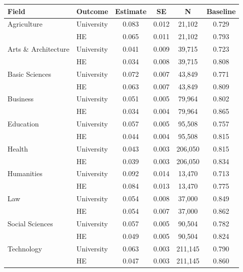 \begin{tabular}{llcccc}
\toprule
Field & Outcome & Estimate & SE & N & Baseline \\
\midrule
Agriculture & University & 0.083 & 0.012 &    21,102 & 0.729 \\
 & HE & 0.065 & 0.011 &    21,102 & 0.793 \\
\midrule
Arts \& Architecture & University & 0.041 & 0.009 &    39,715 & 0.723 \\
 & HE & 0.034 & 0.008 &    39,715 & 0.808 \\
\midrule
Basic Sciences & University & 0.072 & 0.007 &    43,849 & 0.771 \\
 & HE & 0.063 & 0.007 &    43,849 & 0.809 \\
\midrule
Business & University & 0.051 & 0.005 &    79,964 & 0.802 \\
 & HE & 0.034 & 0.004 &    79,964 & 0.865 \\
\midrule
Education & University & 0.057 & 0.005 &    95,508 & 0.757 \\
 & HE & 0.044 & 0.004 &    95,508 & 0.815 \\
\midrule
Health & University & 0.043 & 0.003 &   206,050 & 0.815 \\
 & HE & 0.039 & 0.003 &   206,050 & 0.834 \\
\midrule
Humanities & University & 0.092 & 0.014 &    13,470 & 0.713 \\
 & HE & 0.084 & 0.013 &    13,470 & 0.775 \\
\midrule
Law & University & 0.054 & 0.008 &    37,000 & 0.849 \\
 & HE & 0.054 & 0.007 &    37,000 & 0.862 \\
\midrule
Social Sciences & University & 0.057 & 0.005 &    90,504 & 0.782 \\
 & HE & 0.049 & 0.005 &    90,504 & 0.824 \\
\midrule
Technology & University & 0.063 & 0.003 &   211,145 & 0.790 \\
 & HE & 0.047 & 0.003 &   211,145 & 0.860 \\
\bottomrule
\end{tabular}
